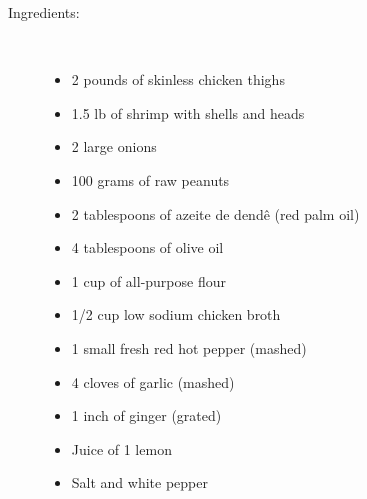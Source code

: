 \documentclass[11pt,letterpaper]{article}
\begin{document}
\begin{description}

\item[Ingredients:]\ \\
	\begin{itemize}
        \item 2 pounds of skinless chicken thighs 
	\item 1.5 lb of shrimp with shells and heads
	\item 2 large onions
	\item 100 grams of raw peanuts
	\item 2 tablespoons of azeite de dend\^{e} (red palm oil) 
	\item 4 tablespoons of olive oil
        \item 1 cup of all-purpose flour
        \item 1/2 cup low sodium chicken broth
	\item 1 small fresh red hot pepper (mashed)
        \item 4 cloves of garlic (mashed)
        \item 1 inch of ginger (grated)
	\item Juice of 1 lemon
	\item Salt and white pepper
	\end{itemize}


\end{description}
\end{document}
